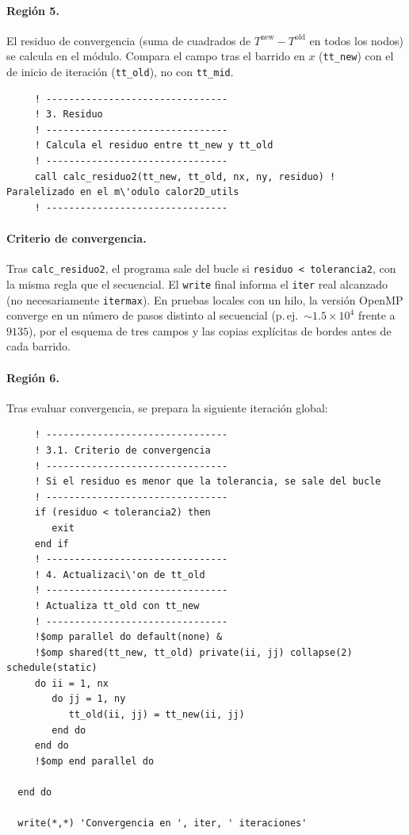 \documentclass[11pt,a4paper]{article}
\begin{document}
\paragraph{Regi\'on 5.}
El residuo de convergencia (suma de cuadrados de
$T^{\mathrm{new}}-T^{\mathrm{old}}$ en todos los nodos) se calcula en el m\'odulo.
Compara el campo tras el barrido en $x$ (\texttt{tt\_new}) con el de inicio de
iteraci\'on (\texttt{tt\_old}), no con \texttt{tt\_mid}.

\begin{verbatim}
     ! --------------------------------
     ! 3. Residuo
     ! --------------------------------
     ! Calcula el residuo entre tt_new y tt_old
     ! --------------------------------
     call calc_residuo2(tt_new, tt_old, nx, ny, residuo) ! Paralelizado en el m\'odulo calor2D_utils
     ! --------------------------------
\end{verbatim}

\paragraph{Criterio de convergencia.}
Tras \texttt{calc\_residuo2}, el programa sale del bucle si
\texttt{residuo < tolerancia2}, con la misma regla que el secuencial. El
\texttt{write} final informa el \texttt{iter} real alcanzado (no necesariamente
\texttt{itermax}). En pruebas locales con un hilo, la versi\'on OpenMP converge
en un n\'umero de pasos distinto al secuencial (p.\,ej.\ $\sim 1.5\times 10^4$
frente a $9135$), por el esquema de tres campos y las copias expl\'icitas de
bordes antes de cada barrido.

\paragraph{Regi\'on 6.}
Tras evaluar convergencia, se prepara la siguiente iteraci\'on global:

\begin{verbatim}
     ! --------------------------------
     ! 3.1. Criterio de convergencia
     ! --------------------------------
     ! Si el residuo es menor que la tolerancia, se sale del bucle
     ! --------------------------------   
     if (residuo < tolerancia2) then
        exit
     end if
     ! --------------------------------
     ! 4. Actualizaci\'on de tt_old
     ! --------------------------------
     ! Actualiza tt_old con tt_new
     ! --------------------------------
     !$omp parallel do default(none) &
     !$omp shared(tt_new, tt_old) private(ii, jj) collapse(2) schedule(static)
     do ii = 1, nx
        do jj = 1, ny
           tt_old(ii, jj) = tt_new(ii, jj)
        end do
     end do
     !$omp end parallel do

  end do

  write(*,*) 'Convergencia en ', iter, ' iteraciones'
\end{verbatim}
\end{document}
